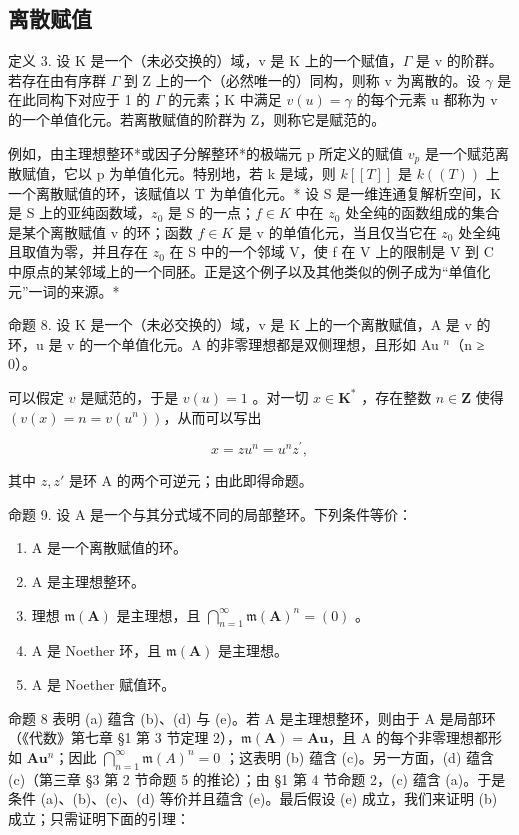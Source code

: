 \subsection{离散赋值}

定义 3. 设 K 是一个（未必交换的）域，v 是 K 上的一个赋值，\(\Gamma\) 是 v 的阶群。若存在由有序群 \(\Gamma\) 到 Z 上的一个（必然唯一的）同构，则称 v 为离散的。设 \(\gamma\) 是在此同构下对应于 1 的 \(\Gamma\) 的元素；K 中满足 \(v(u) = \gamma\) 的每个元素 u 都称为 v 的一个单值化元。若离散赋值的阶群为 Z，则称它是赋范的。

例如，由主理想整环*或因子分解整环*的极端元 p 所定义的赋值 \(v_{p}\) 是一个赋范离散赋值，它以 p 为单值化元。特别地，若 k 是域，则 \(k[[T]]\) 是 \(k((T))\) 上一个离散赋值的环，该赋值以 T 为单值化元。* 设 S 是一维连通复解析空间，K 是 S 上的亚纯函数域，\(z_{0}\) 是 S 的一点；\(f \in K\) 中在 \(z_{0}\) 处全纯的函数组成的集合是某个离散赋值 v 的环；函数 \(f \in K\) 是 v 的单值化元，当且仅当它在 \(z_{0}\) 处全纯且取值为零，并且存在 \(z_{0}\) 在 S 中的一个邻域 V，使 f 在 V 上的限制是 V 到 C 中原点的某邻域上的一个同胚。正是这个例子以及其他类似的例子成为“单值化元”一词的来源。*

命题 8. 设 K 是一个（未必交换的）域，v 是 K 上的一个离散赋值，A 是 v 的环，u 是 v 的一个单值化元。A 的非零理想都是双侧理想，且形如 Au \(^{n}\)（n ≥ 0）。

可以假定 \(v\) 是赋范的，于是 \(v(u) = 1\) 。对一切 \(x \in \mathbf{K}^*\) ，存在整数 \(n \in \mathbf{Z}\) 使得 \((v(x) = n = v(u^n))\)，从而可以写出

\[
x = z u ^ {n} = u ^ {n} z ^ {\prime},
\]

其中 \(z, z'\) 是环 A 的两个可逆元；由此即得命题。

命题 9. 设 A 是一个与其分式域不同的局部整环。下列条件等价：

\begin{enumerate}
\def\labelenumi{(\alph{enumi})}
\item
  A 是一个离散赋值的环。
\item
  A 是主理想整环。
\item
  理想 \(\mathfrak{m}(\mathbf{A})\) 是主理想，且 \(\bigcap_{n=1}^{\infty} \mathfrak{m}(\mathbf{A})^n = (0)\) 。
\item
  A 是 Noether 环，且 \(\mathfrak{m}(\mathbf{A})\) 是主理想。
\item
  A 是 Noether 赋值环。
\end{enumerate}

命题 8 表明 (a) 蕴含 (b)、(d) 与 (e)。若 A 是主理想整环，则由于 A 是局部环（《代数》第七章 §1 第 3 节定理 2），\(\mathfrak{m}(\mathbf{A}) = \mathbf{A}\mathbf{u}\)，且 A 的每个非零理想都形如 \(\mathbf{A}\mathbf{u}^n\)；因此 \(\bigcap_{n=1}^{\infty} \mathfrak{m}(A)^n = 0\) ；这表明 (b) 蕴含 (c)。另一方面，(d) 蕴含 (c)（第三章 §3 第 2 节命题 5 的推论）；由 §1 第 4 节命题 2，(c) 蕴含 (a)。于是条件 (a)、(b)、(c)、(d) 等价并且蕴含 (e)。最后假设 (e) 成立，我们来证明 (b) 成立；只需证明下面的引理：

